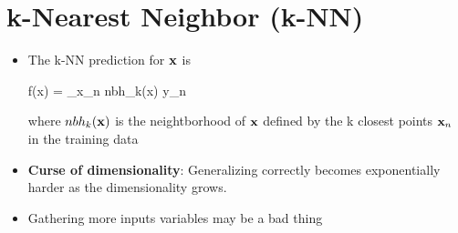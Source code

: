
\section{k-Nearest Neighbor (k-NN)}
\begin{itemize}
	\item The k-NN prediction for $\mathbf{x}$ is
	\begin{myalign*}
	    f(\*x) =  \sum_{\*x_n \in nbh_k(\*x)} y_n
	\end{myalign*}
	where $nbh_k(\mathbf{x})$ is the neightborhood of $\mathbf{x}$ defined by the k closest points $\mathbf{x}_n$ in the training data
	\item \textbf{Curse of dimensionality}: Generalizing correctly becomes exponentially harder as the dimensionality grows.
	\item Gathering more inputs variables may be a bad thing
\end{itemize}


